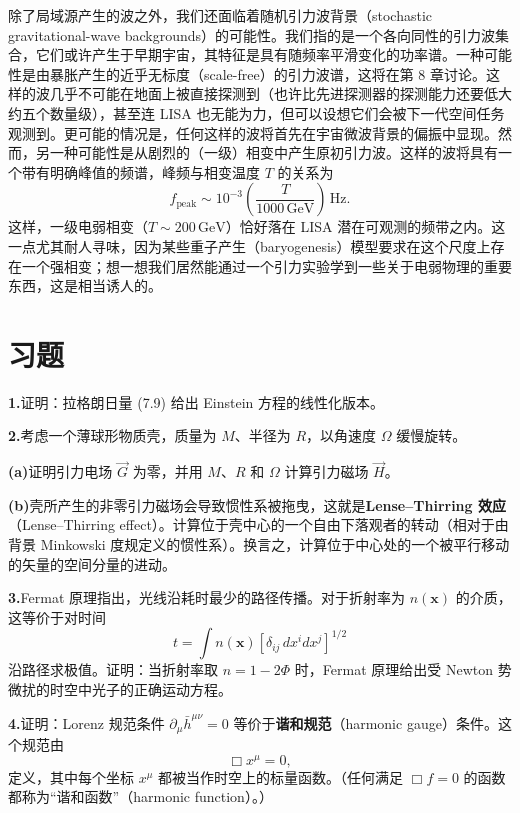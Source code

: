 除了局域源产生的波之外，我们还面临着随机引力波背景（stochastic gravitational-wave backgrounds）的可能性。我们指的是一个各向同性的引力波集合，它们或许产生于早期宇宙，其特征是具有随频率平滑变化的功率谱。一种可能性是由暴胀产生的近乎无标度（scale-free）的引力波谱，这将在第 8 章讨论。这样的波几乎不可能在地面上被直接探测到（也许比先进探测器的探测能力还要低大约五个数量级），甚至连 LISA 也无能为力，但可以设想它们会被下一代空间任务观测到。更可能的情况是，任何这样的波将首先在宇宙微波背景的偏振中显现。然而，另一种可能性是从剧烈的（一级）相变中产生原初引力波。这样的波将具有一个带有明确峰值的频谱，峰频与相变温度 $T$ 的关系为
\begin{equation*}
f_{\mathrm{peak}} \sim 10^{-3}\left(\frac{T}{1000\,\mathrm{GeV}}\right)\,\mathrm{Hz}.
\tag{7.203}
\end{equation*}
这样，一级电弱相变（$T \sim 200\,\mathrm{GeV}$）恰好落在 LISA 潜在可观测的频带之内。这一点尤其耐人寻味，因为某些重子产生（baryogenesis）模型要求在这个尺度上存在一个强相变；想一想我们居然能通过一个引力实验学到一些关于电弱物理的重要东西，这是相当诱人的。

\section{习题}

\textbf{1.}\quad 证明：拉格朗日量 (7.9) 给出 Einstein 方程的线性化版本。

\textbf{2.}\quad 考虑一个薄球形物质壳，质量为 $M$、半径为 $R$，以角速度 $\Omega$ 缓慢旋转。

\textbf{(a)}\quad 证明引力电场 $\vec{G}$ 为零，并用 $M$、$R$ 和 $\Omega$ 计算引力磁场 $\vec{H}$。

\textbf{(b)}\quad 壳所产生的非零引力磁场会导致惯性系被拖曳，这就是\textbf{Lense--Thirring 效应}（Lense--Thirring effect）。计算位于壳中心的一个自由下落观者的转动（相对于由背景 Minkowski 度规定义的惯性系）。换言之，计算位于中心处的一个被平行移动的矢量的空间分量的进动。


\textbf{3.}\quad Fermat 原理指出，光线沿耗时最少的路径传播。对于折射率为 $n(\mathbf{x})$ 的介质，这等价于对时间
\begin{equation*}
t = \int n(\mathbf{x})\left[\delta_{ij}\, dx^i dx^j\right]^{1/2}
\tag{7.204}
\end{equation*}
沿路径求极值。证明：当折射率取 $n = 1 - 2\Phi$ 时，Fermat 原理给出受 Newton 势微扰的时空中光子的正确运动方程。

\textbf{4.}\quad 证明：Lorenz 规范条件 $\partial_\mu\bar{h}^{\mu\nu} = 0$ 等价于\textbf{谐和规范}（harmonic gauge）条件。这个规范由
\begin{equation*}
\Box x^\mu = 0,
\tag{7.205}
\end{equation*}
定义，其中每个坐标 $x^\mu$ 都被当作时空上的标量函数。（任何满足 $\Box f = 0$ 的函数都称为“谐和函数”（harmonic function）。）

